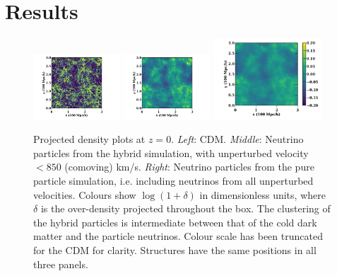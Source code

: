 \documentclass[useAMS, usenatbib]{mnras}
\begin{document}

\section{Results}
\label{sec:results}

\begin{figure}
\includegraphics[trim={1.5cm 0 3.3cm 0},clip,width=0.29\textwidth]{nuplots/dens-plt-b300p512nu0_4hyb850t1.pdf}
\includegraphics[trim={1.5cm 0 3.3cm 0},clip, width=0.29\textwidth]{nuplots/dens-plt-b300p512nu0_4hyb850t2.pdf}
\includegraphics[trim={1.5cm 0 0.5cm 0},clip, width=0.36\textwidth]{nuplots/dens-plt-b300p512nu0_4p1024t2.pdf}
\caption{Projected density plots at $z=0$. \emph{Left}: CDM. \emph{Middle}: Neutrino particles from the hybrid simulation, with unperturbed velocity $<850$ (comoving) km/s. \emph{Right}: Neutrino particles from the pure particle simulation, i.e. including neutrinos from all unperturbed velocities. Colours show $\log (1+ \delta)$ in dimensionless units, where $\delta$ is the over-density projected throughout the box.
  The clustering of the hybrid particles is intermediate between that of the cold dark matter and the particle neutrinos. Colour scale has been truncated for the CDM for clarity. Structures have the same positions in all three panels.
  }
  \label{fig:density_plot}
\end{figure}
\end{document}
